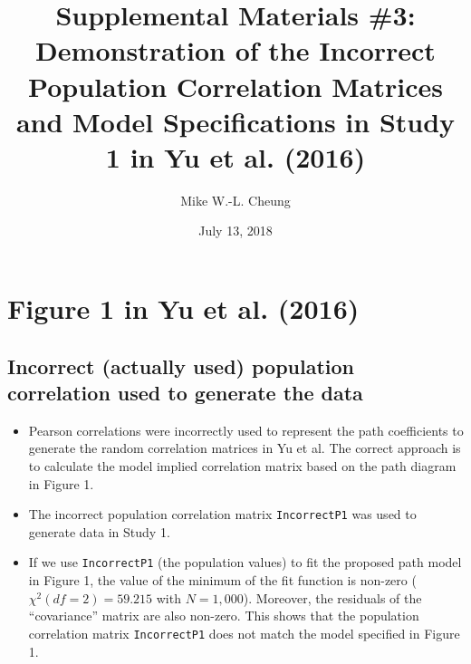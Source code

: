 \documentclass[]{article}
\title{Supplemental Materials \#3: Demonstration of the Incorrect Population
Correlation Matrices and Model Specifications in Study 1 in Yu et al.
(2016)}
\author{Mike W.-L. Cheung}
\date{July 13, 2018}
\providecommand{\tightlist}{%
  \setlength{\itemsep}{0pt}\setlength{\parskip}{0pt}}
\begin{document}
\maketitle

{
\setcounter{tocdepth}{2}
\tableofcontents
}
\section{Figure 1 in Yu et al. (2016)}\label{figure-1-in-yu-et-al.-2016}

\subsection{Incorrect (actually used) population correlation used to
generate the
data}\label{incorrect-actually-used-population-correlation-used-to-generate-the-data}

\begin{itemize}
\tightlist
\item
  Pearson correlations were incorrectly used to represent the path
  coefficients to generate the random correlation matrices in Yu et al.
  The correct approach is to calculate the model implied correlation
  matrix based on the path diagram in Figure 1.
\item
  The incorrect population correlation matrix \texttt{IncorrectP1} was
  used to generate data in Study 1.
\item
  If we use \texttt{IncorrectP1} (the population values) to fit the
  proposed path model in Figure 1, the value of the minimum of the fit
  function is non-zero (\(\chi^2(df=2)=59.215\) with \(N=1,000\)).
  Moreover, the residuals of the ``covariance'' matrix are also
  non-zero. This shows that the population correlation matrix
  \texttt{IncorrectP1} does not match the model specified in Figure 1.
\end{itemize}
\end{document}
